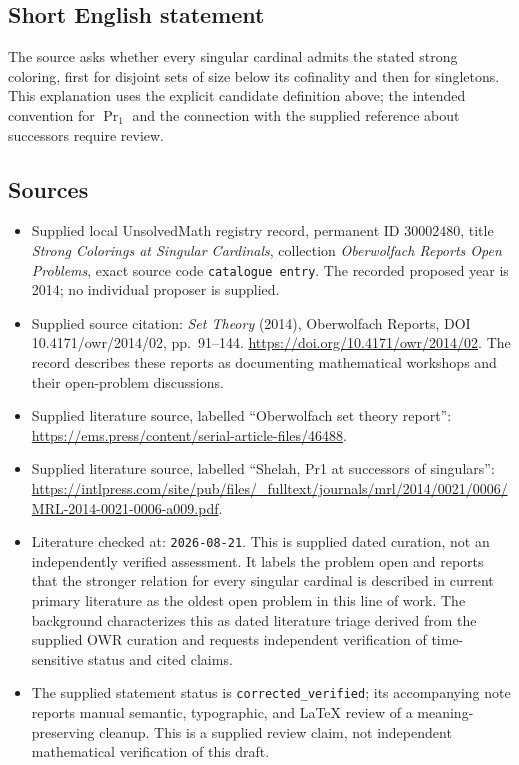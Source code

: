 \documentclass[11pt]{article}
\begin{document}
\subsection{Short English statement}
The source asks whether every singular cardinal admits the stated strong coloring, first for disjoint sets of size below its cofinality and then for singletons. This explanation uses the explicit candidate definition above; the intended convention for $\operatorname{Pr}_1$ and the connection with the supplied reference about successors require review.
\subsection{Sources}
\begin{itemize}
\item Supplied local UnsolvedMath registry record, permanent ID $30002480$, title \emph{Strong Colorings at Singular Cardinals}, collection \emph{Oberwolfach Reports Open Problems}, exact source code \texttt{catalogue entry}. The recorded proposed year is 2014; no individual proposer is supplied.
\item Supplied source citation: \emph{Set Theory} (2014), Oberwolfach Reports, DOI 10.4171/owr/2014/02, pp.\ 91--144. \url{https://doi.org/10.4171/owr/2014/02}. The record describes these reports as documenting mathematical workshops and their open-problem discussions.
\item Supplied literature source, labelled ``Oberwolfach set theory report'': \url{https://ems.press/content/serial-article-files/46488}.
\item Supplied literature source, labelled ``Shelah, Pr1 at successors of singulars'': \url{https://intlpress.com/site/pub/files/_fulltext/journals/mrl/2014/0021/0006/MRL-2014-0021-0006-a009.pdf}.
\item Literature checked at: \texttt{2026-08-21}. This is supplied dated curation, not an independently verified assessment. It labels the problem open and reports that the stronger relation for every singular cardinal is described in current primary literature as the oldest open problem in this line of work. The background characterizes this as dated literature triage derived from the supplied OWR curation and requests independent verification of time-sensitive status and cited claims.
\item The supplied statement status is \texttt{corrected\_verified}; its accompanying note reports manual semantic, typographic, and LaTeX review of a meaning-preserving cleanup. This is a supplied review claim, not independent mathematical verification of this draft.
\end{itemize}
\end{document}

